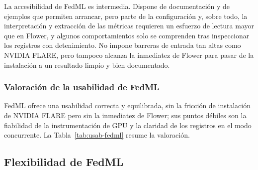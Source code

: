 La accesibilidad de FedML es intermedia. Dispone de documentación y de ejemplos que permiten
arrancar, pero parte de la configuración y, sobre todo, la interpretación y extracción de las
métricas requieren un esfuerzo de lectura mayor que en Flower, y algunos comportamientos solo
se comprenden tras inspeccionar los registros con detenimiento. No impone barreras de entrada
tan altas como NVIDIA FLARE, pero tampoco alcanza la inmediatez de Flower para pasar de la
instalación a un resultado limpio y bien documentado.

\subsubsection{Valoración de la usabilidad de FedML}\label{sec:usab-fedml-valoracion}

FedML ofrece una usabilidad correcta y equilibrada, sin la fricción de instalación de NVIDIA
FLARE pero sin la inmediatez de Flower; sus puntos débiles son la fiabilidad de la
instrumentación de GPU y la claridad de los registros en el modo concurrente. La
Tabla~\ref{tab:usab-fedml} resume la valoración.

\begin{table}[htbp]
  \centering
  \caption{Valoración de la usabilidad de FedML según las cuatro dimensiones de la rúbrica
  (escala 1--5).}
  \label{tab:usab-fedml}
\end{table}

\subsection{Flexibilidad de FedML}\label{sec:flex-fedml}

